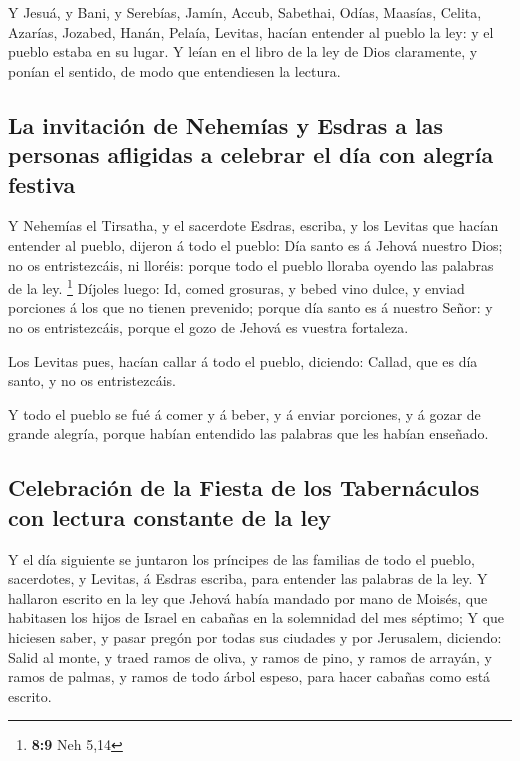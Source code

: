  Y Jesuá, y Bani, y Serebías, Jamín, Accub, Sabethai,
Odías, Maasías, Celita, Azarías, Jozabed, Hanán, Pelaía, Levitas, hacían
entender al pueblo la ley: y el pueblo estaba en su lugar.
 Y leían en el libro de la ley de Dios claramente, y
ponían el sentido, de modo que entendiesen la lectura.

\hypertarget{la-invitaciuxf3n-de-nehemuxedas-y-esdras-a-las-personas-afligidas-a-celebrar-el-duxeda-con-alegruxeda-festiva}{%
\subsection{La invitación de Nehemías y Esdras a las personas afligidas
a celebrar el día con alegría
festiva}\label{la-invitaciuxf3n-de-nehemuxedas-y-esdras-a-las-personas-afligidas-a-celebrar-el-duxeda-con-alegruxeda-festiva}}

 Y Nehemías el Tirsatha, y el sacerdote Esdras, escriba, y
los Levitas que hacían entender al pueblo, dijeron á todo el pueblo: Día
santo es á Jehová nuestro Dios; no os entristezcáis, ni lloréis: porque
todo el pueblo lloraba oyendo las palabras de la ley. \footnote{\textbf{8:9}
  Neh 5,14}  Díjoles luego: Id, comed grosuras, y bebed
vino dulce, y enviad porciones á los que no tienen prevenido; porque día
santo es á nuestro Señor: y no os entristezcáis, porque el gozo de
Jehová es vuestra fortaleza.

 Los Levitas pues, hacían callar á todo el pueblo,
diciendo: Callad, que es día santo, y no os entristezcáis.

 Y todo el pueblo se fué á comer y á beber, y á enviar
porciones, y á gozar de grande alegría, porque habían entendido las
palabras que les habían enseñado.

\hypertarget{celebraciuxf3n-de-la-fiesta-de-los-tabernuxe1culos-con-lectura-constante-de-la-ley}{%
\subsection{Celebración de la Fiesta de los Tabernáculos con lectura
constante de la
ley}\label{celebraciuxf3n-de-la-fiesta-de-los-tabernuxe1culos-con-lectura-constante-de-la-ley}}

 Y el día siguiente se juntaron los príncipes de las
familias de todo el pueblo, sacerdotes, y Levitas, á Esdras escriba,
para entender las palabras de la ley.  Y hallaron escrito
en la ley que Jehová había mandado por mano de Moisés, que habitasen los
hijos de Israel en cabañas en la solemnidad del mes séptimo;
 Y que hiciesen saber, y pasar pregón por todas sus
ciudades y por Jerusalem, diciendo: Salid al monte, y traed ramos de
oliva, y ramos de pino, y ramos de arrayán, y ramos de palmas, y ramos
de todo árbol espeso, para hacer cabañas como está escrito.


